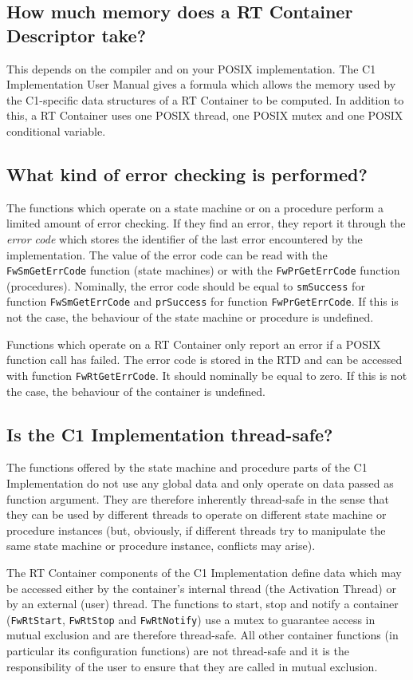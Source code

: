 \documentclass[faq]{../fwprofile}
\begin{document}
\subsection{How much memory does a RT Container Descriptor take?}
This depends on the compiler and on your POSIX implementation. The C1 Implementation User Manual gives a formula which allows the memory used by the C1-specific data structures of a RT Container to be computed. In addition to this, a RT Container uses one POSIX thread, one POSIX mutex and one POSIX conditional variable.

\subsection{What kind of error checking is performed?}
The functions which operate on a state machine or on a procedure perform a limited amount of error checking. If they find an error, they report 
it through the \emph{error code} which stores the identifier of the last error encountered by the implementation. The value of the error code can be read 
with the \texttt{FwSmGetErrCode} function (state machines) or with the \texttt{FwPrGetErrCode} function (procedures). Nominally, the error code should 
be equal to \texttt{smSuccess} for function \texttt{FwSmGetErrCode} and \texttt{prSuccess} for function \texttt{FwPrGetErrCode}. If this is not the case, the behaviour of the state machine or procedure is undefined.

Functions which operate on a RT Container only report an error if a POSIX function call has failed. The error code is stored in the RTD and can be accessed with function \texttt{FwRtGetErrCode}. It should nominally be equal to zero. If this is not the case, the behaviour of the container is undefined.

\subsection{Is the C1 Implementation thread-safe?}
The functions offered by the state machine and procedure parts of the C1 Implementation do not use any global data and only operate on data passed as function argument. They are therefore inherently thread-safe in the sense that they can be used by different threads to operate on different state machine or procedure instances (but, obviously, if different threads try to manipulate the same state machine or procedure instance, conflicts may arise).

The RT Container components of the C1 Implementation define data which may be accessed either by the container's internal thread (the Activation Thread) or by an external (user) thread. The functions to start, stop and notify a container (\texttt{FwRtStart}, \texttt{FwRtStop} and \texttt{FwRtNotify}) use a mutex to guarantee access in mutual exclusion and are therefore thread-safe. All other container functions (in particular its configuration functions) are not thread-safe and it is the responsibility of the user to ensure that they are called in mutual exclusion.
\end{document}

